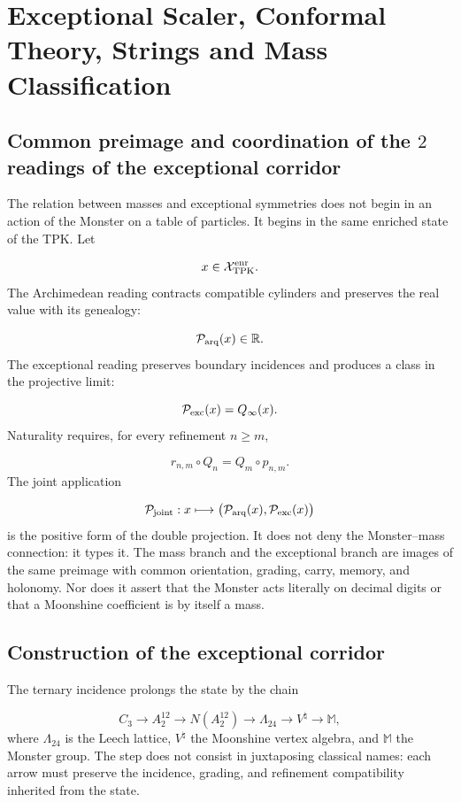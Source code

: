 \section{Exceptional Scaler, Conformal Theory, Strings and Mass Classification}
\subsection{Common preimage and coordination of the \(2\) readings of the exceptional corridor}
The relation between masses and exceptional symmetries does not begin in an action of the Monster on a table of particles. It begins in the same enriched state of the TPK. Let

\[
x\in\mathcal X_{\rm TPK}^{\rm enr}.
\]
The Archimedean reading contracts compatible cylinders and preserves the real value with its genealogy:

\[
\mathcal P_{\rm arq}(x)\in\mathbb R.
\]
The exceptional reading preserves boundary incidences and produces a class in the projective limit:

\[
\mathcal P_{\rm exc}(x)=Q_\infty(x).
\]
Naturality requires, for every refinement \(n\ge m\),

\[
r_{n,m}\circ Q_n=Q_m\circ p_{n,m}.
\]
The joint application

\[
\mathcal P_{\rm joint}:x\longmapsto
\bigl(\mathcal P_{\rm arq}(x),\mathcal P_{\rm exc}(x)\bigr)
\]
is the positive form of the double projection. It does not deny the Monster--mass connection: it types it. The mass branch and the exceptional branch are images of the same preimage with common orientation, grading, carry, memory, and holonomy. Nor does it assert that the Monster acts literally on decimal digits or that a Moonshine coefficient is by itself a mass.

\subsection{Construction of the exceptional corridor}
The ternary incidence prolongs the state by the chain

\[
C_3
\longrightarrow A_2^{12}
\longrightarrow N(A_2^{12})
\longrightarrow \Lambda_{24}
\longrightarrow V^\natural
\longrightarrow \mathbb M,
\]
where \(\Lambda_{24}\) is the Leech lattice, \(V^\natural\) the Moonshine vertex algebra, and \(\mathbb M\) the Monster group. The step does not consist in juxtaposing classical names: each arrow must preserve the incidence, grading, and refinement compatibility inherited from the state.


